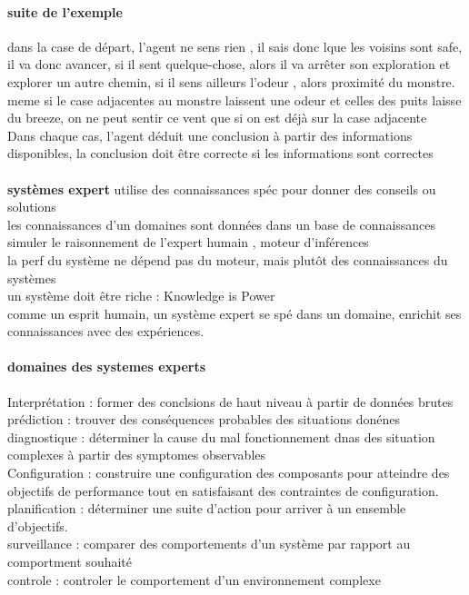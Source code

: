 \documentclass{article}
\begin{document}
\paragraph{suite de l'exemple} dans la case de départ, l'agent ne sens rien , il sais donc lque les voisins sont safe, il va donc avancer, si il sent quelque-chose, alors il va arrêter son exploration et explorer un autre chemin, si il sens ailleurs l'odeur , alors proximité du monstre.  meme si le case adjacentes au monstre laissent une odeur et celles des puits laisse du breeze, on ne peut sentir ce vent  que si on est déjà sur la case adjacente\\Dans chaque cas, l'agent déduit une conclusion à partir des informations disponibles, la conclusion doit être correcte si les informations sont correctes\\\\\textbf{systèmes expert} utilise des connaissances spéc pour donner des conseils ou solutions\\les connaissances d'un domaines sont données dans un base de connaissances \\simuler le raisonnement de l'expert humain , moteur d'inférences\\la perf du système ne dépend pas du moteur, mais plutôt des connaissances du systèmes\\un système doit être riche : Knowledge is Power\\comme un esprit humain, un système expert se spé dans un domaine, enrichit ses connaissances avec des expériences.
\paragraph{domaines des systemes experts} Interprétation : former des conclsions de haut niveau à partir de données brutes\\prédiction : trouver des conséquences probables des situations donénes\\diagnostique : déterminer la cause du mal fonctionnement dnas des situation complexes à partir des symptomes observables\\Configuration : construire une configuration des composants pour atteindre des objectifs de performance tout en satisfaisant des contraintes de configuration. \\planification : déterminer une suite d'action pour arriver à un ensemble d'objectifs.\\surveillance : comparer des comportements d'un système par rapport au comportment souhaité\\controle : controler le comportement d'un environnement complexe
\end{document}
